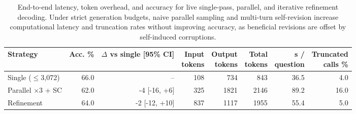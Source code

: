\begin{table}[t]
\centering
\small
\caption{End-to-end latency, token overhead, and accuracy for live single-pass, parallel, and iterative refinement decoding. Under strict generation budgets, naive parallel sampling and multi-turn self-revision increase computational latency and truncation rates without improving accuracy, as beneficial revisions are offset by self-induced corruptions.}
\label{tab:t3-live}
\begin{tabular}{lrrrrrrr}
\toprule
Strategy & Acc. \% & \makecell{$\Delta$ vs single\\{}[95\% CI]} & \makecell{Input\\tokens} & \makecell{Output\\tokens} & \makecell{Total\\tokens} & \makecell{s /\\question} & \makecell{Truncated\\calls \%} \\
\midrule
Single ($\leq$3,072) & 66.0 & – & 108 & 734 & 843 & 36.5 & 4.0 \\
Parallel $\times$3 + SC & 62.0 & -4 [-16, +6] & 325 & 1821 & 2146 & 89.2 & 16.0 \\
Refinement & 64.0 & -2 [-12, +10] & 837 & 1117 & 1955 & 55.4 & 5.0 \\
\bottomrule
\end{tabular}
\end{table}
